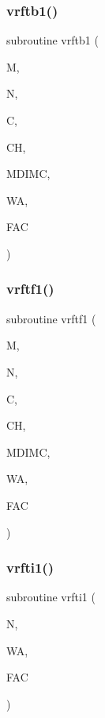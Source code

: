 \mbox{\label{sfft_8f_a67a1e9e0f31cb6a7c668c544acd5ed81}} 
\subsubsection{\texorpdfstring{vrftb1()}{vrftb1()}}
{\footnotesize\ttfamily subroutine vrftb1 (\begin{DoxyParamCaption}\item[{}]{M,  }\item[{}]{N,  }\item[{dimension(mdimc,n)}]{C,  }\item[{dimension(mdimc,n)}]{CH,  }\item[{}]{M\+D\+I\+MC,  }\item[{dimension(n)}]{WA,  }\item[{dimension(15)}]{F\+AC }\end{DoxyParamCaption})}

\mbox{\label{sfft_8f_a7da099aef7dae58a938aa6ddc20fb28d}} 
\subsubsection{\texorpdfstring{vrftf1()}{vrftf1()}}
{\footnotesize\ttfamily subroutine vrftf1 (\begin{DoxyParamCaption}\item[{}]{M,  }\item[{}]{N,  }\item[{dimension(mdimc,n)}]{C,  }\item[{dimension(mdimc,n)}]{CH,  }\item[{}]{M\+D\+I\+MC,  }\item[{dimension(n)}]{WA,  }\item[{dimension(15)}]{F\+AC }\end{DoxyParamCaption})}

\mbox{\label{sfft_8f_a48b013eedb6ac3aa95d12d241e2787e3}} 
\subsubsection{\texorpdfstring{vrfti1()}{vrfti1()}}
{\footnotesize\ttfamily subroutine vrfti1 (\begin{DoxyParamCaption}\item[{}]{N,  }\item[{dimension(n)}]{WA,  }\item[{dimension(15)}]{F\+AC }\end{DoxyParamCaption})}

